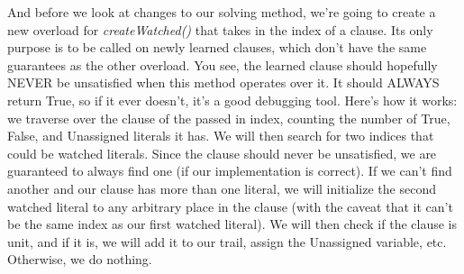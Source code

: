 \documentclass[../main.tex]{subfiles}
\begin{document}
And before we look at changes to our solving method, we're going to create a new 
overload for \textit{createWatched()} that takes in the index of a clause. Its 
only purpose is to be called on newly learned clauses, which don't have the same 
guarantees as the other overload. You see, the learned clause should hopefully 
NEVER be unsatisfied when this method operates over it. It should ALWAYS return 
True, so if it ever doesn't, it's a good debugging tool. Here's how it works:
we traverse over the clause of the passed in index, counting the number of 
True, False, and Unassigned literals it has. We will then search for two 
indices that could be watched literals. Since the clause should never be 
unsatisfied, we are guaranteed to always find one (if our implementation is correct).
If we can't find another and our clause has more than one literal, we will initialize 
the second watched literal to any arbitrary place in the clause (with the caveat 
that it can't be the same index as our first watched literal). We will then check if the 
clause is unit, and if it is, we will add it to our trail, assign the Unassigned variable,
etc. Otherwise, we do nothing.
\end{document}
